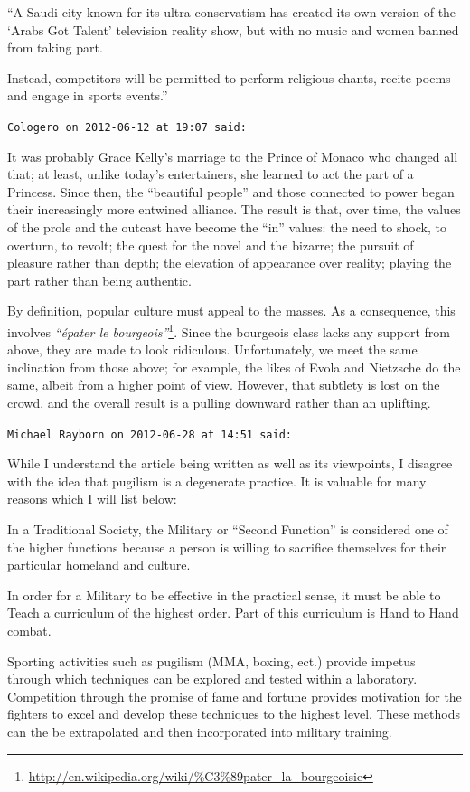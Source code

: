 \begin{footnotesize}
\begin{sffamily}
``A Saudi city known for its ultra-conservatism has created its own version of the `Arabs Got Talent' television reality show, but with no music and women banned from taking part.

Instead, competitors will be permitted to perform religious chants, recite poems and engage in sports events.''

\hfill

\texttt{Cologero on 2012-06-12 at 19:07 said:}

It was probably Grace Kelly's marriage to the Prince of Monaco who changed all that; at least, unlike today's entertainers, she learned to act the part of a Princess. Since then, the ``beautiful people'' and those connected to power began their increasingly more entwined alliance. The result is that, over time, the values of the prole and the outcast have become the ``in'' values: the need to shock, to overturn, to revolt; the quest for the novel and the bizarre; the pursuit of pleasure rather than depth; the elevation of appearance over reality; playing the part rather than being authentic.

By definition, popular culture must appeal to the masses. As a consequence, this involves
\textit{``épater le bourgeois''}\footnote{\url{http://en.wikipedia.org/wiki/\%C3\%89pater\_la\_bourgeoisie}}. Since the bourgeois class lacks any support from above, they are made to look ridiculous. Unfortunately, we meet the same inclination from those above; for example, the likes of Evola and Nietzsche do the same, albeit from a higher point of view. However, that subtlety is lost on the crowd, and the overall result is a pulling downward rather than an uplifting.

\hfill

\texttt{Michael Rayborn on 2012-06-28 at 14:51 said:}

While I understand the article being written as well as its viewpoints, I disagree with the idea that pugilism is a degenerate practice. It is valuable for many reasons which I will list below:

In a Traditional Society, the Military or ``Second Function'' is considered one of the higher functions because a person is willing to sacrifice themselves for their particular homeland and culture.

In order for a Military to be effective in the practical sense, it must be able to Teach a curriculum of the highest order. Part of this curriculum is Hand to Hand combat.

Sporting activities such as pugilism (MMA, boxing, ect.) provide impetus through which techniques can be explored and tested within a laboratory. Competition through the promise of fame and fortune provides motivation for the fighters to excel and develop these techniques to the highest level. These methods can the be extrapolated and then incorporated into military training.


\end{sffamily}
\end{footnotesize}

